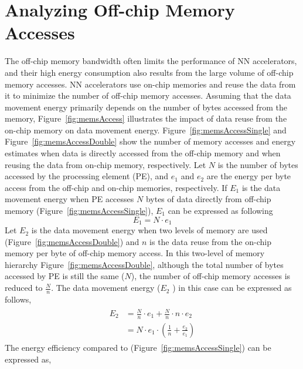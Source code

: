 \graphicspath{{./Ch2-AnalyticalFw/images/}}

\chapter{Analyzing Off-chip Memory Accesses} \label{chap:analyticalFw}
The off-chip memory bandwidth often limits the performance of NN accelerators, and their high energy consumption also results from the large volume of off-chip memory accesses. NN accelerators use on-chip memories and reuse the data from it to minimize the number of off-chip memory accesses. Assuming that the data movement energy primarily depends on the number of bytes accessed from the memory, Figure~\ref{fig:memsAccess} illustrates the impact of data reuse from the on-chip memory on data movement energy. Figure~\ref{fig:memsAccessSingle} and Figure~\ref{fig:memsAccessDouble} show the number of memory accesses and energy estimates when data is directly accessed from the off-chip memory and when reusing the data from on-chip memory, respectively. Let $N$ is the number of bytes accessed by the processing element (PE), and $e_{1}$ and $e_{2}$ are the energy per byte access from the off-chip and on-chip memories, respectively. If $E_1$ is the data movement energy when PE accesses $N$ bytes of data directly from off-chip memory (Figure~\ref{fig:memsAccessSingle}), $E_1$ can be expressed as following
\begin{equation}\label{eq:E_1} 
	E_{1}= N\cdot e_1
\end{equation}
Let $E_2$ is the data movement energy when two levels of memory are used (Figure~\ref{fig:memsAccessDouble}) and $n$ is the data reuse from the on-chip memory per byte of off-chip memory access. In this two-level of memory hierarchy Figure~\ref{fig:memsAccessDouble}, although the total number of bytes accessed by PE is still the same ($N$), the number of off-chip memory accesses is reduced to $\frac{N}{n}$. The data movement energy ($E_2$ ) in this case can be expressed as follows,
\begin{align}\label{eq:E_2}
	\begin{split}
	E_{2}&= \frac{N}{n}\cdot e_1 + \frac{N}{n}\cdot n\cdot e_2 \\
	&= N\cdot e_1\cdot (\frac{1}{n}+ \frac{e_2}{e_1})
	\end{split}
\end{align}
The energy efficiency compared to (Figure~\ref{fig:memsAccessSingle}) can be expressed as, 
